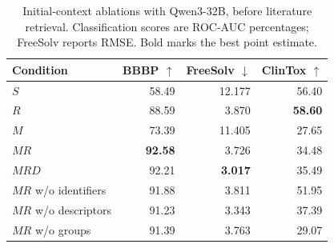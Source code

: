 \begin{table}[t]
\centering
\small
\begin{tabular}{lrrr}
\toprule
Condition & BBBP $\uparrow$ & FreeSolv $\downarrow$ & ClinTox $\uparrow$ \\
\midrule
$S$ & 58.49 & 12.177 & 56.40 \\
$R$ & 88.59 & 3.870 & \textbf{58.60} \\
$M$ & 73.39 & 11.405 & 27.65 \\
$MR$ & \textbf{92.58} & 3.726 & 34.48 \\
$MRD$ & 92.21 & \textbf{3.017} & 35.49 \\
\midrule
$MR$ w/o identifiers & 91.88 & 3.811 & 51.95 \\
$MR$ w/o descriptors & 91.23 & 3.343 & 37.39 \\
$MR$ w/o groups & 91.39 & 3.763 & 29.07 \\
\bottomrule
\end{tabular}
\caption{Initial-context ablations with Qwen3-32B, before literature retrieval. Classification scores are ROC-AUC percentages; FreeSolv reports RMSE. Bold marks the best point estimate.}
\label{tab:context-ablation}
\end{table}

